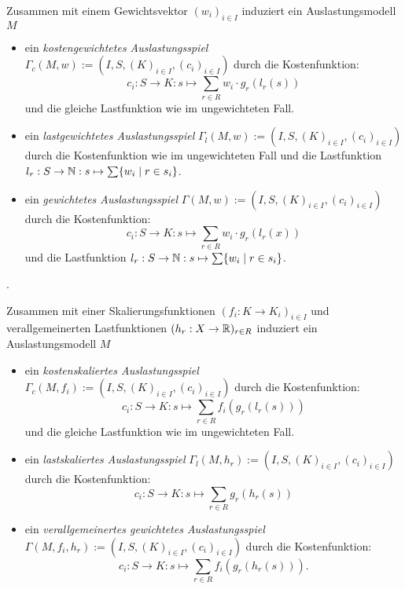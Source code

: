 \begin{defn}\label{def:gewAuslastungsspiel}
	Zusammen mit einem Gewichtsvektor $(w_i)_{i\in I}$ induziert ein Auslastungsmodell $M$ 
	\begin{itemize}
		\item ein \emph{kostengewichtetes Auslastungsspiel} $\Gamma_c(M, w) := (I, S, (K)_{i\in I}, (c_i)_{i \in I})$ durch die Kostenfunktion:
		\[c_i: S \to K: s \mapsto \sum_{r \in R} w_i\cdot g_r(l_r(s)) \]
		und die gleiche Lastfunktion wie im ungewichteten Fall.
		\item ein \emph{lastgewichtetes Auslastungsspiel} $\Gamma_l(M, w) := (I, S, (K)_{i\in I}, (c_i)_{i \in I})$ durch die Kostenfunktion wie im ungewichteten Fall und die Lastfunktion $l_r: S \to \mathbb{N}: s \mapsto \sum\{w_i \mid r \in s_i\}$.
		\item ein \emph{gewichtetes Auslastungsspiel} $\Gamma(M, w) := (I, S, (K)_{i\in I}, (c_i)_{i \in I})$ durch die Kostenfunktion:
		\[c_i: S \to K: s \mapsto \sum_{r \in R} w_i\cdot g_r(l_r(x)) \]
		und die Lastfunktion $l_r: S \to \mathbb{N}: s \mapsto \sum\{w_i \mid r \in s_i\}$.
	\end{itemize}	
\end{defn}

\begin{bsp}.
	
\end{bsp}

\begin{defn}\label{def:skalierteAuslastungsspiel}
	Zusammen mit einer Skalierungsfunktionen $(f_i: K \to K_i)_{i\in I}$ und verallgemeinerten Lastfunktionen $(h_r: X \to \mathbb{R})_{r\in R}$ induziert ein Auslastungsmodell $M$ 
	\begin{itemize}
		\item ein \emph{kostenskaliertes Auslastungsspiel} $\Gamma_c(M, f_i) := (I, S, (K)_{i\in I}, (c_i)_{i \in I})$ durch die Kostenfunktion:
		\[c_i: S \to K: s \mapsto \sum_{r \in R} f_i(g_r(l_r(s))) \]
		und die gleiche Lastfunktion wie im ungewichteten Fall.
		\item ein \emph{lastskaliertes Auslastungsspiel} $\Gamma_l(M, h_r) := (I, S, (K)_{i\in I}, (c_i)_{i \in I})$ durch die Kostenfunktion:
		\[c_i: S \to K: s \mapsto \sum_{r \in R} g_r(h_r(s)) \]
		\item ein \emph{verallgemeinertes gewichtetes Auslastungsspiel} $\Gamma(M, f_i, h_r) := (I, S, (K)_{i\in I}, (c_i)_{i \in I})$ durch die Kostenfunktion:
		\[c_i: S \to K: s \mapsto \sum_{r \in R} f_i(g_r(h_r(s))).\]
	\end{itemize}	
\end{defn}



